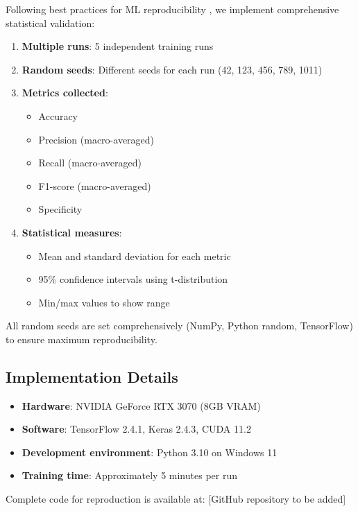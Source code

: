 \documentclass[conference]{IEEEtran}
\begin{document}
Following best practices for ML reproducibility \cite{reimers2017reporting}, we implement comprehensive statistical validation:

\begin{enumerate}
    \item \textbf{Multiple runs}: 5 independent training runs
    \item \textbf{Random seeds}: Different seeds for each run (42, 123, 456, 789, 1011)
    \item \textbf{Metrics collected}: 
    \begin{itemize}
        \item Accuracy
        \item Precision (macro-averaged)
        \item Recall (macro-averaged)
        \item F1-score (macro-averaged)
        \item Specificity
    \end{itemize}
    \item \textbf{Statistical measures}:
    \begin{itemize}
        \item Mean and standard deviation for each metric
        \item 95\% confidence intervals using t-distribution
        \item Min/max values to show range
    \end{itemize}
\end{enumerate}

All random seeds are set comprehensively (NumPy, Python random, TensorFlow) to ensure maximum reproducibility.

\subsection{Implementation Details}

\begin{itemize}
    \item \textbf{Hardware}: NVIDIA GeForce RTX 3070 (8GB VRAM)
    \item \textbf{Software}: TensorFlow 2.4.1, Keras 2.4.3, CUDA 11.2
    \item \textbf{Development environment}: Python 3.10 on Windows 11
    \item \textbf{Training time}: Approximately 5 minutes per run
\end{itemize}

Complete code for reproduction is available at: [GitHub repository to be added]
\end{document}
